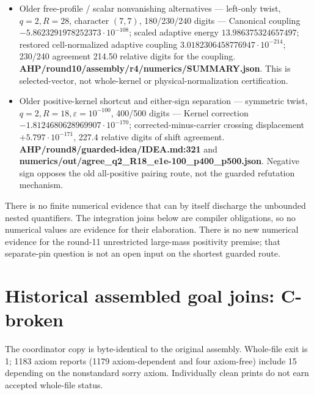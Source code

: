 \begin{itemize}
\item  Older free-profile / scalar nonvanishing alternatives  ---  left-only twist, \(q=2,R=28\), character \((7,7)\), 180/230/240 digits  ---  Canonical coupling \(-5.8623291978252373\cdot10^{-108}\); scaled adaptive energy \(13.986375324657497\); restored cell-normalized adaptive coupling \(3.0182306458776947\cdot10^{-214}\); 230/240 agreement 214.50 relative digits for the coupling. \textbf{AHP/round10/assembly/r4/numerics/SUMMARY.json}. This is selected-vector, not whole-kernel or physical-normalization certification. 
\item  Older positive-kernel shortcut and either-sign separation  ---  symmetric twist, \(q=2,R=18,\varepsilon=10^{-100}\), 400/500 digits  ---  Kernel correction \(-1.8124680628969907\cdot10^{-170}\); corrected-minus-carrier crossing displacement \(+5.797\cdot10^{-171}\), 227.4 relative digits of shift agreement. \textbf{AHP/round8/guarded-idea/IDEA.md:321} and \textbf{numerics/out/agree\_q2\_R18\_e1e-100\_p400\_p500.json}. Negative sign opposes the old all-positive pairing route, not the guarded refutation mechanism. 
\end{itemize}

There is no finite numerical evidence that can by itself discharge the unbounded nested quantifiers. The integration joins below are compiler obligations, so no numerical values are evidence for their elaboration. There is no new numerical evidence for the round-11 unrestricted large-mass positivity premise; that separate-pin question is not an open input on the shortest guarded route.


\section{Historical assembled goal joins: C-broken}
The coordinator copy is byte-identical to the original assembly. Whole-file exit is 1; 1183 axiom reports (1179 axiom-dependent and four axiom-free) include 15 depending on the nonstandard sorry axiom. Individually clean prints do not earn accepted whole-file status.

